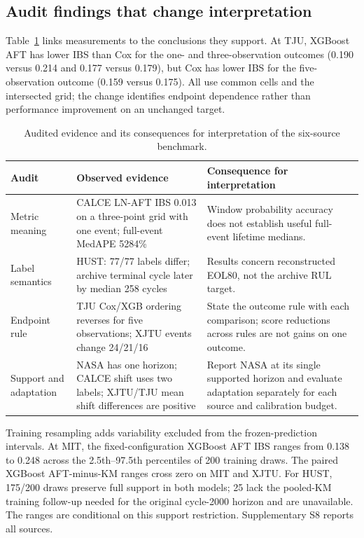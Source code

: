 \documentclass[preprint,12pt]{elsarticle}
\begin{document}
\subsection{Audit findings that change interpretation}
Table~\ref{tab:judgment} links measurements to the conclusions they support. At TJU, XGBoost AFT has lower IBS than Cox for the one- and three-observation outcomes (0.190 versus 0.214 and 0.177 versus 0.179), but Cox has lower IBS for the five-observation outcome (0.159 versus 0.175). All use common cells and the intersected grid; the change identifies endpoint dependence rather than performance improvement on an unchanged target.
\begin{table}[htbp]\centering\small
\caption{Audited evidence and its consequences for interpretation of the six-source benchmark.}\label{tab:judgment}
\begin{tabular}{@{}>{\raggedright\arraybackslash}p{26mm}>{\raggedright\arraybackslash}p{48mm}>{\raggedright\arraybackslash}p{50mm}@{}}\toprule
Audit & Observed evidence & Consequence for interpretation \\\midrule
Metric meaning & CALCE LN-AFT IBS 0.013 on a three-point grid with one event; full-event MedAPE 5284\% & Window probability accuracy does not establish useful full-event lifetime medians.\\[3pt]
Label semantics & HUST: 77/77 labels differ; archive terminal cycle later by median 258 cycles & Results concern reconstructed EOL80, not the archive RUL target.\\[3pt]
Endpoint rule & TJU Cox/XGB ordering reverses for five observations; XJTU events change 24/21/16 & State the outcome rule with each comparison; score reductions across rules are not gains on one outcome.\\[3pt]
Support and adaptation & NASA has one horizon; CALCE shift uses two labels; XJTU/TJU mean shift differences are positive & Report NASA at its single supported horizon and evaluate adaptation separately for each source and calibration budget.\\\bottomrule
\end{tabular}
\end{table}

Training resampling adds variability excluded from the frozen-prediction intervals. At MIT, the fixed-configuration XGBoost AFT IBS ranges from 0.138 to 0.248 across the 2.5th--97.5th percentiles of 200 training draws. The paired XGBoost AFT-minus-KM ranges cross zero on MIT and XJTU. For HUST, 175/200 draws preserve full support in both models; 25 lack the pooled-KM training follow-up needed for the original cycle-2000 horizon and are unavailable. The ranges are conditional on this support restriction. Supplementary S8 reports all sources.
\end{document}
